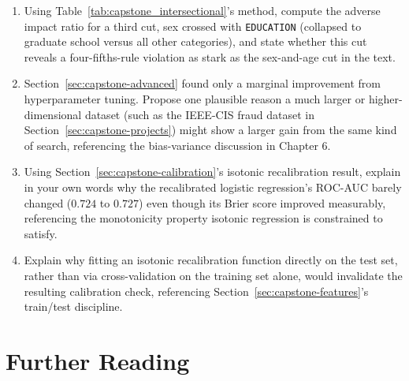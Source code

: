 \documentclass[../ai_in_finance]{subfiles}
\begin{document}
\begin{enumerate}
    \item Using Table~\ref{tab:capstone_intersectional}'s method, compute the adverse impact ratio for a third cut, sex crossed with \texttt{EDUCATION} (collapsed to graduate school versus all other categories), and state whether this cut reveals a four-fifths-rule violation as stark as the sex-and-age cut in the text.
    \item Section~\ref{sec:capstone-advanced} found only a marginal improvement from hyperparameter tuning. Propose one plausible reason a much larger or higher-dimensional dataset (such as the IEEE-CIS fraud dataset in Section~\ref{sec:capstone-projects}) might show a larger gain from the same kind of search, referencing the bias-variance discussion in Chapter 6.
    \item Using Section~\ref{sec:capstone-calibration}'s isotonic recalibration result, explain in your own words why the recalibrated logistic regression's ROC-AUC barely changed ($0.724$ to $0.727$) even though its Brier score improved measurably, referencing the monotonicity property isotonic regression is constrained to satisfy.
    \item Explain why fitting an isotonic recalibration function directly on the test set, rather than via cross-validation on the training set alone, would invalidate the resulting calibration check, referencing Section~\ref{sec:capstone-features}'s train/test discipline.
\end{enumerate}

\section{Further Reading}
\end{document}
